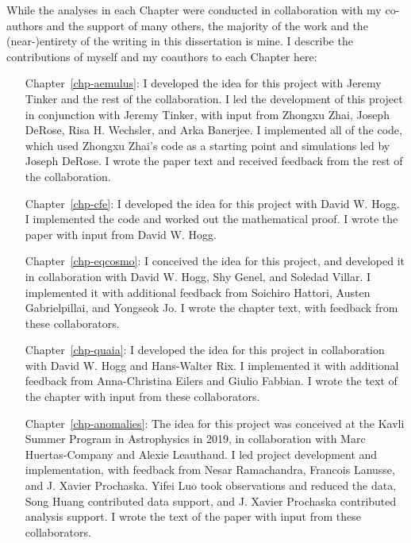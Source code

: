 While the analyses in each Chapter were conducted in collaboration with my co-authors and the support of many others, the majority of the work and the (near-)entirety of the writing in this dissertation is mine. 
I describe the contributions of myself and my coauthors to each Chapter here:
\begin{enumerate}[leftmargin=4\parindent]
    \item[Chapter~\ref{chp-aemulus}:] I developed the idea for this project with Jeremy Tinker and the rest of the \aemulus collaboration. I led the development of this project in conjunction with Jeremy Tinker, with input from Zhongxu Zhai, Joseph DeRose, Risa H. Wechsler, and Arka Banerjee. I implemented all of the code, which used Zhongxu Zhai's code as a starting point and simulations led by Joseph DeRose. I wrote the paper text and received feedback from the rest of the collaboration.
    \item[Chapter~\ref{chp-cfe}:] I developed the idea for this project with David W. Hogg. I implemented the code and worked out the mathematical proof. I wrote the paper with input from David W. Hogg.
    \item[Chapter~\ref{chp-eqcosmo}:] I conceived the idea for this project, and developed it in collaboration with David W. Hogg, Shy Genel, and Soledad Villar. I implemented it with additional feedback from Soichiro Hattori, Austen Gabrielpillai, and Yongseok Jo. I wrote the chapter text, with feedback from these collaborators.
    \item[Chapter~\ref{chp-quaia}:] I developed the idea for this project in collaboration with David W. Hogg and Hans-Walter Rix. I implemented it with additional feedback from Anna-Christina Eilers and Giulio Fabbian. I wrote the text of the chapter with input from these collaborators.
    \item[Chapter~\ref{chp-anomalies}:] The idea for this project was conceived at the Kavli Summer Program in Astrophysics in 2019, in collaboration with Marc Huertas-Company and Alexie Leauthaud. I led project development and implementation, with feedback from Nesar Ramachandra, Francois Lanusse, and J. Xavier Prochaska. Yifei Luo took observations and reduced the data, Song Huang contributed data support, and J. Xavier Prochaska contributed analysis support. I wrote the text of the paper with input from these collaborators.
\end{enumerate}


